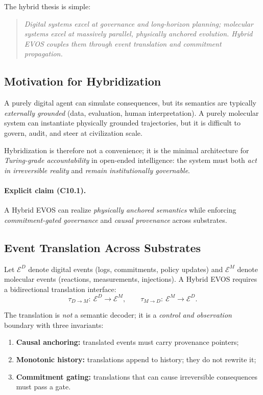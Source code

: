 \documentclass[11pt]{article}
\begin{document}
The hybrid thesis is simple:

\begin{quote}
\emph{Digital systems excel at governance and long-horizon planning; molecular systems
excel at massively parallel, physically anchored evolution. Hybrid EVOS couples them
through event translation and commitment propagation.}
\end{quote}

\subsection{Motivation for Hybridization}
\label{sec:motivation-hybrid}

A purely digital agent can simulate consequences, but its semantics are typically
\emph{externally grounded} (data, evaluation, human interpretation). A purely molecular
system can instantiate physically grounded trajectories, but it is difficult to govern,
audit, and steer at civilization scale.

Hybridization is therefore not a convenience; it is the minimal architecture for
\emph{Turing-grade accountability} in open-ended intelligence: the system must both
\emph{act in irreversible reality} and \emph{remain institutionally governable}.

\paragraph{Explicit claim (C10.1).}
A Hybrid EVOS can realize \emph{physically anchored semantics} while enforcing
\emph{commitment-gated governance} and \emph{causal provenance} across substrates.

\subsection{Event Translation Across Substrates}
\label{sec:event-translation}

Let $\mathcal{E}^D$ denote digital events (logs, commitments, policy updates) and
$\mathcal{E}^M$ denote molecular events (reactions, measurements, injections). A Hybrid
EVOS requires a bidirectional translation interface:
\[
\tau_{D\rightarrow M}:\ \mathcal{E}^D \rightarrow \mathcal{E}^M,
\qquad
\tau_{M\rightarrow D}:\ \mathcal{E}^M \rightarrow \mathcal{E}^D.
\]

The translation is \emph{not} a semantic decoder; it is a \emph{control and observation}
boundary with three invariants:

\begin{enumerate}
  \item \textbf{Causal anchoring:} translated events must carry provenance pointers;
  \item \textbf{Monotonic history:} translations append to history; they do not rewrite it;
  \item \textbf{Commitment gating:} translations that can cause irreversible consequences must pass a gate.
\end{enumerate}
\end{document}
